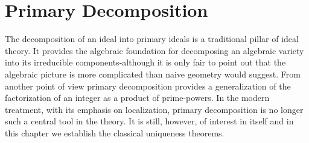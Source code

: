 \section{Primary Decomposition}
The decomposition of an ideal into primary ideals is a traditional pillar of ideal theory. It provides the algebraic foundation for decomposing an algebraic variety into its irreducible components-although it is only fair to point out that the algebraic picture is more complicated than naive geometry would suggest. From another point of view primary decomposition provides a generalization of the factorization of an integer as a product of prime-powers. In the modern treatment, with its emphasis on localization, primary decomposition is no longer such a central tool in the theory. It is still, however, of interest in itself and in this chapter we establish the classical uniqueness theorems.
